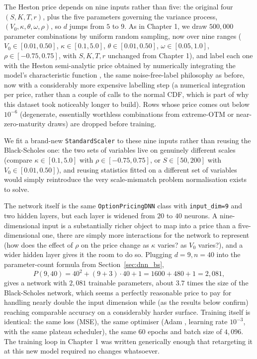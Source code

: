 \documentclass[a4paper,11pt, titlepage]{article}
\theoremstyle{definition}
\theoremstyle{plain}
\theoremstyle{remark}
\begin{document}
The Heston price depends on nine inputs rather than five: the original four $(S, K, T, r)$, plus the five parameters governing the variance process, $(V_0, \kappa, \theta, \omega, \rho)$, so $d$ jumps from $5$ to $9$. As in Chapter 1, we draw $500{,}000$ parameter combinations by uniform random sampling, now over nine ranges ($V_0 \in [0.01, 0.50]$, $\kappa \in [0.1, 5.0]$, $\theta \in [0.01, 0.50]$, $\omega \in [0.05, 1.0]$, $\rho \in [-0.75, 0.75]$, with $S, K, T, r$ unchanged from Chapter 1), and label each one with the Heston semi-analytic price obtained by numerically integrating the model's characteristic function \cite{heston1993}, the same noise-free-label philosophy as before, now with a considerably more expensive labelling step (a numerical integration per price, rather than a couple of calls to the normal CDF, which is part of why this dataset took noticeably longer to build). Rows whose price comes out below $10^{-6}$ (degenerate, essentially worthless combinations from extreme-OTM or near-zero-maturity draws) are dropped before training.

We fit a brand-new \texttt{StandardScaler} to these nine inputs rather than reusing the Black-Scholes one: the two sets of variables live on genuinely different scales (compare $\kappa \in [0.1, 5.0]$ with $\rho \in [-0.75, 0.75]$, or $S \in [50, 200]$ with $V_0 \in [0.01, 0.50]$), and reusing statistics fitted on a different set of variables would simply reintroduce the very scale-mismatch problem normalisation exists to solve.

The network itself is the same \texttt{OptionPricingDNN} class with \texttt{input\_dim=9} and two hidden layers, but each layer is widened from $20$ to $40$ neurons. A nine-dimensional input is a substantially richer object to map into a price than a five-dimensional one, there are simply more interactions for the network to represent (how does the effect of $\rho$ on the price change as $\kappa$ varies? as $V_0$ varies?), and a wider hidden layer gives it the room to do so. Plugging $d = 9, n = 40$ into the parameter-count formula from Section~\ref{sec:dnn_bs},
\[
P(9, 40) = 40^2 + (9 + 3)\cdot 40 + 1 = 1600 + 480 + 1 = 2{,}081,
\]
gives a network with $2{,}081$ trainable parameters, about $3.7$ times the size of the Black-Scholes network, which seems a perfectly reasonable price to pay for handling nearly double the input dimension while (as the results below confirm) reaching comparable accuracy on a considerably harder surface. Training itself is identical: the same loss (MSE), the same optimiser (Adam \cite{kingma2015}, learning rate $10^{-3}$, with the same plateau scheduler), the same $60$ epochs and batch size of $4{,}096$. The training loop in Chapter 1 was written generically enough that retargeting it at this new model required no changes whatsoever.
\end{document}

